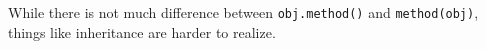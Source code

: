 While there is not much difference between
\lstinline{obj.method()} and \lstinline{method(obj)},
things like inheritance are harder to realize.

\begin{comment}
\begin{block}{Functions on structures}
  \label{sl:struct-pass}
  You can pass a structure to a function:
  \snippetwithoutput{structpass}{struct}{pointfun}
\end{block}

\begin{exercise}
  \label{ex:vecstruct-angle}
  \hbox{%
    \begin{minipage}[t]{.6\hsize}
      Write a vector class, and a function that, given such a  vector, returns the
      angle with the $x$-axis. (Hint: the \lstinline$atan$ function is in \lstinline$cmath$)
    \end{minipage}
    \texttt{[image: xy-atan]}
    }

  \answerwithoutput{anglepi4}{struct}{pointangle}
\end{exercise}

The mechanisms of \indextermbus{parameter}{passing by value} and
\indextermbus{parameter}{passing by reference} apply to structures just as
to simple datatypes.

\begin{exercise}
  \label{ex:vecstruct-flip}
  Write a \lstinline$void$ function that has a \lstinline$struct vector$ parameter,
  and exchanges its coordinates:
  \[ \begin{pmatrix}2.5\\3.5\end{pmatrix} \rightarrow
    \begin{pmatrix}3.5\\2.5\end{pmatrix} \]
  \answerwithoutput{flip32}{struct}{pointflip}
\end{exercise}

\begin{exercise}
  \label{ex:vecstruct-scale}
  Write a function $y=f(x,a)$ that takes a \lstinline$struct vector$ and
  \lstinline$double$ parameter as input, and returns a vector that is the
  input multiplied by the scalar.
  \[ \begin{pmatrix}2.5\\3.5\end{pmatrix},3 \rightarrow
    \begin{pmatrix}7.5\\10.5\end{pmatrix} \]
\end{exercise}
\end{comment}


